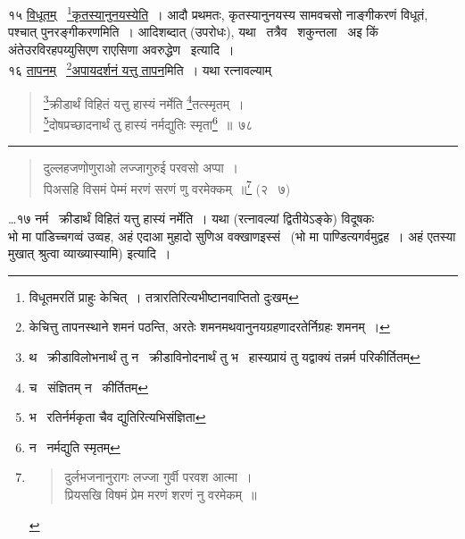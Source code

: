 \documentclass[11pt, openany]{book}
\begin{document}
१५ \underline{विधूतम्} \textendash\ \underline{\renewcommand{\thefootnote}{$\oint$}\footnote{विधूतमरतिं प्राहुः केचित्~। तत्रारतिरित्यभीष्टानवाप्तितो दुःखम्}कृतस्यानुनयस्येति}~। आदौ प्रथमतः, कृतस्यानुनयस्य सामवचसो नाङ्गीकरणं विधूतं, पश्चात् पुनरङ्गीकरणमिति~। आदिशब्दात् (उपरोधः), यथा \textendash\ तत्रैव \textendash\ शकुन्तला \textendash\ अइ किं अंतेउरविरहपय्युसिएण राएसिणा अवरुद्धेण \textendash\ इत्यादि~।\\

१६ \underline{तापनम्} \textendash\ \underline{\renewcommand{\thefootnote}{$\dagger$}\footnote{केचित्तु तापनस्थाने शमनं पठन्ति, अरतेः शमनमथवानुनयग्रहणादरतेर्निग्रहः शमनम्~।}अपायदर्शनं यत्तु तापन}मिति~। यथा रत्नावल्याम् \textendash

\newpage

\begin{quote}
{\na \renewcommand{\thefootnote}{1}\footnote{थ \textendash\ क्रीडाविलोभनार्थं तु न \textendash\ क्रीडाविनोदनार्थं तु भ \textendash\ हास्यप्रायं तु यद्वाक्यं तन्नर्म परिकीर्तितम्}क्रीडार्थं विहितं यत्तु हास्यं नर्मेति \renewcommand{\thefootnote}{2}\footnote{च \textendash\ संज्ञितम् न \textendash\ कीर्तितम्}तत्स्मृतम्~।\\
\renewcommand{\thefootnote}{3}\footnote{भ \textendash\ रतिर्नर्मकृता चैव द्युतिरित्यभिसंज्ञिता}दोषप्रच्छादनार्थं तु हास्यं नर्मद्युतिः स्मृता\renewcommand{\thefootnote}{4}\footnote{न \textendash\ नर्मद्युति स्मृतम्}~॥~७८}
\end{quote}

\hrule

\begin{quote}
{\qt दुल्लहजणोणुराओ लज्जागुरुई परवसो अप्पा~।\\
पिअसहि विसमं पेम्मं मरणं सरणं णु वरमेक्कम्~॥}\renewcommand{\thefootnote}{*}\footnote{\begin{quote}
{\qt दुर्लभजनानुरागः लज्जा गुर्वी परवश आत्मा~।\\
प्रियसखि विषमं प्रेम मरणं शरणं नु वरमेकम्~॥}
\end{quote}} (२ \textendash\ ७)
\end{quote}

\noindent
\ldots १७ नर्म \textendash\ क्रीडार्थं विहितं यत्तु हास्यं नर्मेति~। यथा (रत्नावल्यां द्वितीयेऽङ्के) विदूषकः \textendash \\

भो मा पांडिच्चगव्वं उव्वह, अहं एदाआ मुहादो सुणिअ वक्खाणइस्सं \textendash\ (भो मा पाण्डित्यगर्वमुद्वह~। अहं एतस्या मुखात् श्रुत्वा व्याख्यास्यामि) इत्यादि~।\\
\end{document}

